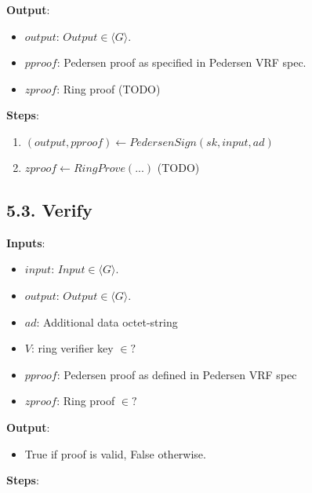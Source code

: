 \documentclass[
]{article}
\providecommand{\tightlist}{%
  \setlength{\itemsep}{0pt}\setlength{\parskip}{0pt}}
\begin{document}
\textbf{Output}:

\begin{itemize}
\tightlist
\item
  \(output\): \(Output \in \langle G \rangle\).
\item
  \(pproof\): Pedersen proof as specified in Pedersen VRF spec.
\item
  \(zproof\): Ring proof (TODO)
\end{itemize}

\textbf{Steps}:

\begin{enumerate}
\def\labelenumi{\arabic{enumi}.}
\tightlist
\item
  \((output, pproof) \leftarrow PedersenSign(sk, input, ad)\)
\item
  \(zproof \leftarrow RingProve(...)\) (TODO)
\end{enumerate}

\hypertarget{verify-2}{%
\subsection{5.3. Verify}\label{verify-2}}

\textbf{Inputs}:

\begin{itemize}
\tightlist
\item
  \(input\): \(Input \in \langle G \rangle\).
\item
  \(output\): \(Output \in \langle G \rangle\).
\item
  \(ad\): Additional data octet-string
\item
  \(V\): ring verifier key \(\in ?\)
\item
  \(pproof\): Pedersen proof as defined in Pedersen VRF spec
\item
  \(zproof\): Ring proof \(\in ?\)
\end{itemize}

\textbf{Output}:

\begin{itemize}
\tightlist
\item
  True if proof is valid, False otherwise.
\end{itemize}

\textbf{Steps}:
\end{document}
